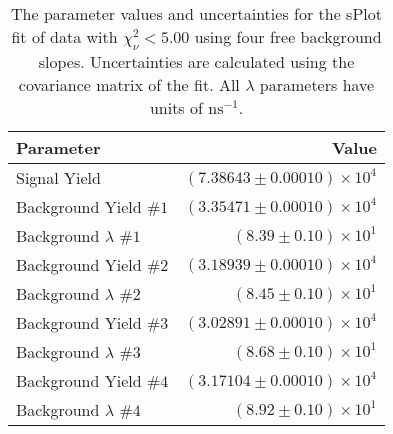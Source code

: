 
\begin{table}[ht]
    \begin{center}
        \begin{tabular}{lr}\toprule
            Parameter & Value \\\midrule
            Signal Yield & $(7.38643 \pm 0.00010) \times 10^{4}$ \\
            Background Yield $\#1$ & $(3.35471 \pm 0.00010) \times 10^{4}$ \\
            Background $\lambda$ $\#1$ & $(8.39 \pm 0.10) \times 10^{1}$ \\
            Background Yield $\#2$ & $(3.18939 \pm 0.00010) \times 10^{4}$ \\
            Background $\lambda$ $\#2$ & $(8.45 \pm 0.10) \times 10^{1}$ \\
            Background Yield $\#3$ & $(3.02891 \pm 0.00010) \times 10^{4}$ \\
            Background $\lambda$ $\#3$ & $(8.68 \pm 0.10) \times 10^{1}$ \\
            Background Yield $\#4$ & $(3.17104 \pm 0.00010) \times 10^{4}$ \\
            Background $\lambda$ $\#4$ & $(8.92 \pm 0.10) \times 10^{1}$ \\\bottomrule
        \end{tabular}
        \caption{The parameter values and uncertainties for the sPlot fit of data with $\chi^2_\nu < 5.00$ using four free background slopes. Uncertainties are calculated using the covariance matrix of the fit. All $\lambda$ parameters have units of $\si{\nano\second}^{-1}$.}\label{tab:splot-fit-results-chisqdof-5.00-free-4}
    \end{center}
\end{table}
